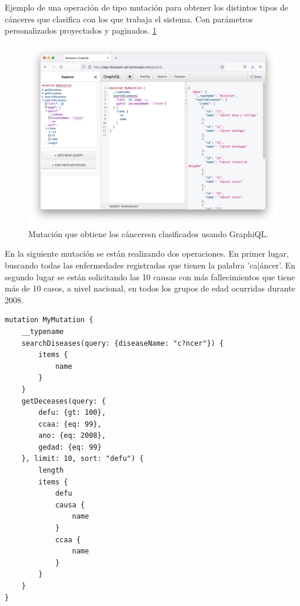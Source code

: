 Ejemplo de una operación de tipo mutación para obtener los distintos tipos de cánceres que
clasifica con los que trabaja el sistema. Con parámetros personalizados proyectados y paginados. \ref{fig:5}
\FloatBarrier
\begin{figure}[h]
	\centering
	\includegraphics[width=\textwidth]{doc/logos/imgs/ejemplo4.png}
	\caption{ Mutación que obtiene los cánceresn clasificados usando GraphiQL. }
	\label{fig:5}
\end{figure}
\FloatBarrier


En la siguiente mutación se están realizando dos operaciones. En primer lugar, buscando
todas las enfermedades registradas que tienen la palabra 'ca|áncer'. En segundo lugar se
están solicitando las 10 causas con más fallecimientos que tiene más de 10 casos, a nivel
nacional, en todos los grupos de edad ocurridas durante 2008.
\begin{lstlisting}[caption=Ejemplo de mutación usando el protocolo GraphQL] 
mutation MyMutation {
    __typename
    searchDiseases(query: {diseaseName: "c?ncer"}) {
        items {
            name
        }
    }
    getDeceases(query: {
        defu: {gt: 100}, 
        ccaa: {eq: 99}, 
        ano: {eq: 2008}, 
        gedad: {eq: 99}
    }, limit: 10, sort: "defu") {
        length
        items {
            defu
            causa {
                name
            }
            ccaa {
                name
            }
        }
    }
}
\end{lstlisting}


